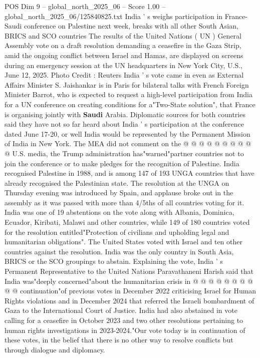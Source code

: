 \begin{textsample}{POS Dim 9 – global\_north\_2025\_06 – Score 1.00 – global\_north\_2025\_06/125840825.txt}  \label{ex:f9_pos_351}
India ' s weighs participation in France-Saudi conference on Palestine next week, breaks with all other South Asian, BRICS and SCO countries The results of the United Nations ( UN ) General Assembly vote on a draft resolution demanding a ceasefire in the Gaza Strip, amid the ongoing conflict between Israel and Hamas, are displayed on screens during an emergency session at the UN headquarters in New York City, U.S., June 12, 2025.
Photo Credit : Reuters India ' s vote came in even as External Affairs Minister S.
Jaishankar is in Paris for bilateral talks with French Foreign Minister Barrot, who is expected to request a high-level participation from India for a UN conference on creating conditions for a"Two-State solution", that France is organising jointly with \textbf{Saudi} Arabia.
Diplomatic sources for both countries said they have not so far heard about India ' s participation at the conference dated June 17-20, or well India would be represented by the Permanent Mission of India in New York.
The MEA did not comment on the @ @ @ @ @ @ @ @ @ @ U.S. media, the Trump administration has"warned"partner countries not to join the conference or to make pledges for the recognition of Palestine.
India recognised Palestine in 1988, and is among 147 of 193 UNGA countries that have already recognised the Palestinian state.
The resolution at the UNGA on Thursday evening was introduced by Spain, and applause broke out in the assembly as it was passed with more than 4/5ths of all countries voting for it.
India was one of 19 abstentions on the vote along with Albania, Dominica, Ecuador, Kiribati, Malawi and other countries, while 149 of 180 countries voted for the resolution entitled"Protection of civilians and upholding legal and humanitarian obligations".
The United States voted with Israel and ten other countries against the resolution.
India was the only country in South Asia, BRICS or the SCO groupings to abstain.
Explaining the vote, India ' s Permanent Representative to the United Nations Paravathaneni Harish said that India was"deeply concerned"about the humanitarian crisis in @ @ @ @ @ @ @ @ @ @ continuation"of previous votes in December 2022 criticising Israel for Human Rights violations and in December 2024 that referred the Israeli bombardment of Gaza to the International Court of Justice.
India had also abstained in vote calling for a ceasefire in October 2023 and two other resolutions pertaining to human rights investigations in 2023-2024."Our vote today is in continuation of these votes, in the belief that there is no other way to resolve conflicts but through dialogue and diplomacy.

\end{textsample}
